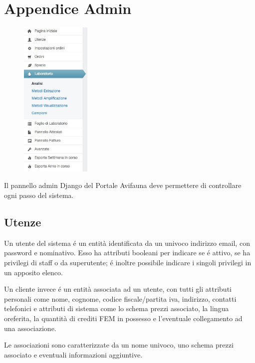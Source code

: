 \chapter{Appendice Admin}
\label{app:admin}

\begin{figure}
  \begin{center}
    \includegraphics[width=0.3\textwidth]{images/suit}
  \end{center}
\end{figure}

Il pannello admin Django del Portale Avifauna deve permettere di controllare ogni passo del sistema.

\section*{Utenze}
Un utente del sistema é un entità identificata da un univoco indirizzo email, con password e nominativo. Esso ha attributi booleani per indicare se é attivo, se ha privilegi di staff o da superutente; é inoltre possibile indicare i singoli privilegi in un apposito elenco.

Un cliente invece é un entità associata ad un utente, con tutti gli attributi personali come nome, cognome, codice fiscale/partita iva, indirizzo, contatti telefonici e attributi di sistema come lo schema prezzi associato, la lingua oreferita, la quantità di crediti FEM in possesso e l'eventuale collegamento ad una associazione.

Le associazioni sono caratterizzate da un nome univoco, uno schema prezzi associato e eventuali informazioni aggiuntive.

